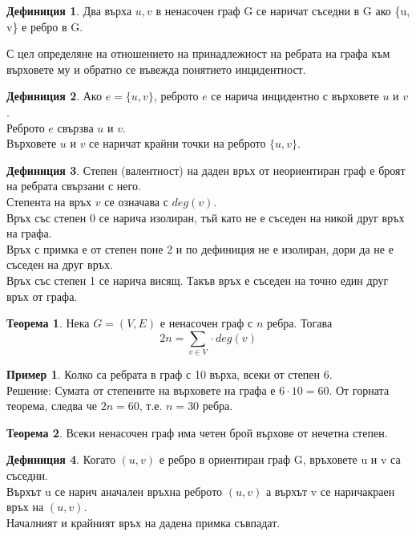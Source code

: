 \documentclass[fleqn, 12pt]{article}
\theoremstyle{definition}
\newtheorem{example}{Пример}[subsection]
\newtheorem{definition}{Дефиниция}[subsection]
\newtheorem{theorem}{Теорема}[subsection]
\begin{document}
\begin{definition}
Два върха $u, v$ в ненасочен граф G се наричат съседни в G ако \{u, v\} е ребро в G.
\end{definition}
С цел определяне на отношението на принадлежност на ребрата на графа към върховете му и обратно се въвежда понятието инцидентност.
\begin{definition}
Ако $e = \{u, v\}$, реброто $e$ се нарича инцидентно с върховете $u$ и $v$. \\
Реброто $e$ свързва $u$ и $v$.\\
Върховете $u$ и $v$ се наричат крайни точки на реброто $\{u, v\}$.
\end{definition}

\begin{definition}
Степен (валентност) на даден връх от неориентиран граф е броят на ребрата свързани с него.\\
Степента на връх $v$ се означава с $deg(v)$.\\
Връх със степен 0 се нарича изолиран, тъй като не е съседен на никой друг връх на графа. \\
Връх с примка е от степен поне 2 и по дефиниция не е изолиран, дори да не е съседен на друг връх.\\
Връх със степен 1 се нарича висящ. Такъв връх е съседен на точно един друг връх от графа.
\end{definition}

\begin{theorem}
Нека $G = (V, E)$ е ненасочен граф с $n$ ребра. Тогава
$$2n = \sum_{v\in V} \cdot deg(v)$$
\end{theorem}

\begin{example}
Колко са ребрата в граф с 10 върха, всеки от степен 6.\\
Решение: Сумата от степените на върховете на графа е $6 \cdot 10 = 60$. От горната теорема, следва че $2n = 60$, т.е. $n=30$ ребра.
\end{example}

\begin{theorem}
Всеки ненасочен граф има четен брой върхове от нечетна степен. 
\end{theorem}

\begin{definition}
Когато $(u, v)$ е ребро в ориентиран граф G, връховете u и v са съседни. \\
Върхът u се нарич аначален връхна реброто $(u, v)$ а върхът v се наричакраен връх на $(u, v)$.\\
Началният и крайният връх на дадена примка съвпадат. 
\end{definition}
\end{document}
